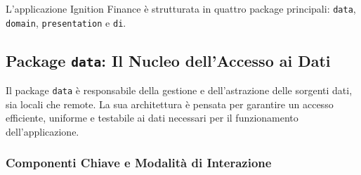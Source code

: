 \documentclass{article}
\begin{document}
L'applicazione Ignition Finance è strutturata in quattro package principali: \texttt{data}, \texttt{domain}, \texttt{presentation} e \texttt{di}.

\subsection{Package \texttt{data}: Il Nucleo dell'Accesso ai Dati}

Il package \texttt{data} è responsabile della gestione e dell'astrazione delle sorgenti dati, sia locali che remote. La sua architettura è pensata per garantire un accesso efficiente, uniforme e testabile ai dati necessari per il funzionamento dell'applicazione.

\subsubsection{Componenti Chiave e Modalità di Interazione}
\end{document}
